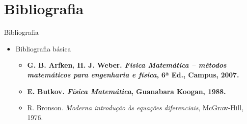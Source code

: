 \documentclass[
size=17pt,
paper=smartboard,
mode=present,
display=slidesnotes,
style=paintings,
nopagebreaks,
blackslide,
fleqn]{powerdot}
\begin{document}


  
   \section[ slide = false ]{Bibliografia}
      \begin{slide}[toc=]{Bibliografia}
         \begin{itemize}
            \item Bibliografia básica
            \begin{itemize}
               \item \textbf{G. B. Arfken, H. J. Weber. \emph{Física Matemática -- métodos matemáticos para engenharia e física}, 6ª Ed., Campus, 2007.}
               \item \textbf{E. Butkov. \emph{Física Matemática}, Guanabara Koogan, 1988.}
               \item {R. Bronson. \emph{Moderna introdução às equações diferenciais}, McGraw-Hill, 1976.}
            \end{itemize}
         \end{itemize}
      \end{slide}
\end{document}

